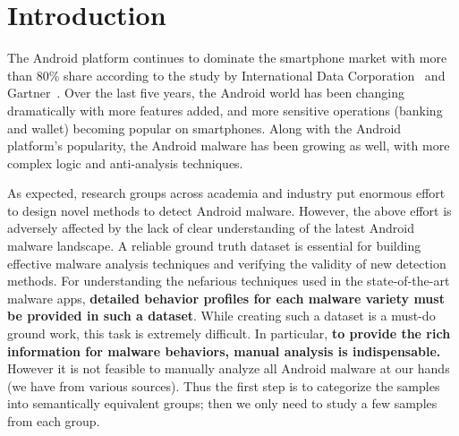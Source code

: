 \vspace{-.1in}
\section{Introduction}
\label{sec:introduction}
\vspace{-.02in}

The Android platform continues to dominate the smartphone market
with more than 80\% share according to the study by 
International Data Corporation~\cite{idc} and Gartner~\cite{gartner}.
Over the last five years, the Android world has been changing dramatically with
more features added, and more sensitive operations (\eg banking and wallet) 
becoming popular on smartphones.
Along with the Android platform's popularity, the Android malware has been growing as well,
with more complex logic and anti-analysis techniques. 

As expected, research groups across academia and industry put
enormous effort to design novel methods to detect Android malware. 
However, the above effort is adversely affected by the lack of clear understanding of 
the latest Android malware landscape. 
A reliable ground truth dataset is essential for building effective 
malware analysis techniques and verifying the validity of new detection methods.
For understanding the nefarious techniques used in the state-of-the-art malware apps, 
{\bf detailed behavior profiles for each malware variety must be provided
in such a dataset}.
While creating such a dataset is a must-do ground work,
this task is extremely difficult.
In particular,
{\bf to provide the rich information for malware behaviors, manual analysis is indispensable.}
However it is not feasible to manually analyze all Android malware at our hands (we have \samsize
from various sources). Thus the first step is to categorize the samples into
semantically equivalent groups; then we only need to study a few samples
from each group.


